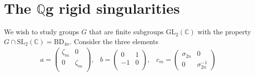 \documentclass[11pt]{report}
\theoremstyle{definition}
\theoremstyle{definition}
\theoremstyle{definition}
\theoremstyle{definition}
\theoremstyle{definition}
\theoremstyle{definition}
\theoremstyle{definition}
\theoremstyle{definition}
\newcommand{\spl}{\text{SL}_2 (\mathbb{C})}
\newcommand{\gl}{\text{GL}_2 (\mathbb{C})}
\begin{document}
 

\section{The $\mathbb{Q}$g rigid singularities}

We wish to study groups $G$ that are finite subgroups $\gl$ with the property $G \cap \spl = \text{BD}_{4n}$. Consider the three elements
\[
\begin{array}{ccc}
a = \left(
\begin{array}{cc}
\zeta_{m} & 0  \\
0 & \zeta_{m} \\
\end{array} \right), &
b = \left(
\begin{array}{cc}
0 & 1  \\
-1 & 0 \\
\end{array} \right), &c_m =
\left( \begin{array}{cc}
\sigma_{2n} & 0 \\
0 & \sigma^{-1}_{2n}
\end{array} \right) 
\end{array}
\]
\end{document}
